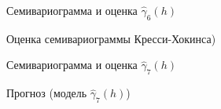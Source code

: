 \begin{figure}[H]
\caption{Семивариограмма и оценка $ \widehat{\gamma}_6(h) $}
\label{img:per-cv-modeled}
\end{figure}

\begin{figure}[H]
\caption{Оценка семивариограммы Кресси-Хокинса)}
\label{img:robust-variogram}
\end{figure}

\begin{figure}[H]
\caption{Семивариограмма и оценка $ \widehat{\gamma}_7(h) $}
\label{img:auto-class-modeled}
\end{figure}

\begin{figure}[H]
\caption{Прогноз (модель $ \widehat{\gamma}_7(h) $)}
\label{img:auto-class-20-pred}
\end{figure}

